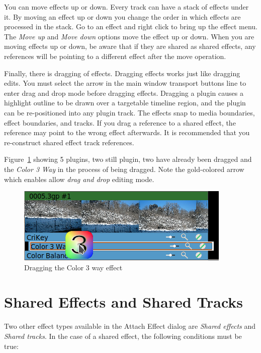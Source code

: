 You can move effects up or down. Every track can have a stack of effects under it. By moving an effect up or down you change the order in which effects are processed in the stack. Go to an effect and right click to bring up the effect menu. The \textit{Move up} and \textit{Move down} options move the effect up or down. When you are moving effects up or down, be aware that if they are shared as shared effects, any references will be pointing to a different effect after the move operation.

Finally, there is dragging of effects. Dragging effects works just like dragging edits. You must select the arrow in the main window transport buttons line to enter drag and drop mode before dragging effects. Dragging a plugin causes a highlight outline to be drawn over a targetable timeline region, and the plugin can be re-positioned into any plugin track.  The effects snap to media boundaries, effect boundaries, and tracks. If you drag a reference to a shared effect, the reference may point to the wrong effect afterwards.  It is recommended that you re-construct shared effect track references.

Figure~\ref{fig:drag-effect} showing 5 plugins, two still plugin, two have already been dragged and the \textit{Color 3 Way} in the process of being dragged. Note the gold-colored arrow which enables allow \textit{drag and drop} editing mode.

\begin{figure}[htpb]
    \centering
    \includegraphics[width=0.7\linewidth]{images/drag-effect.png}
    \caption{Dragging the Color 3 way effect}
    \label{fig:drag-effect}
\end{figure}

\section{Shared Effects and Shared Tracks}%
\label{sec:shared_effect_tracks}

Two other effect types available in the Attach Effect dialog are \textit{Shared effects} and \textit{Shared tracks}. In the case of a shared effect, the following conditions must be true:

